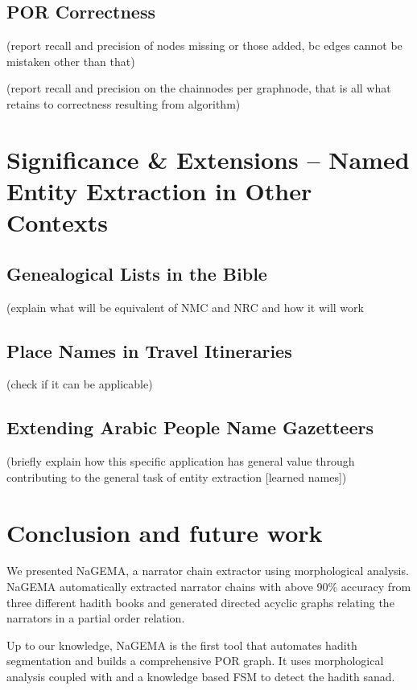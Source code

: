 \documentclass[11pt]{article}
\begin{document}
\subsection{POR Correctness}

(report recall and precision of nodes missing or those added, bc edges cannot be mistaken other than that)

(report recall and precision on the chainnodes per graphnode, that is all what retains to correctness resulting from algorithm)

\section{Significance \& Extensions -- Named Entity Extraction in Other Contexts}

\subsection{Genealogical Lists in the Bible}

(explain what will be equivalent of NMC and NRC and how it will work

\subsection{Place Names in Travel Itineraries}

(check if it can be applicable)

\subsection{Extending Arabic People Name Gazetteers}

(briefly explain how this specific application has general value through contributing to the general task of entity extraction [learned names])

\section{Conclusion and future work}
\label{sec:future}

We presented NaGEMA, a narrator chain extractor
using morphological analysis. 
NaGEMA automatically extracted narrator chains with 
above 90\% accuracy
from three different hadith books and generated 
directed acyclic graphs relating the narrators 
in a partial order relation. 

Up to our knowledge, NaGEMA is the first 
tool that automates hadith segmentation and builds
a comprehensive POR graph.
It uses morphological analysis coupled with 
and a knowledge based FSM to  detect the hadith 
sanad. 
\end{document}
